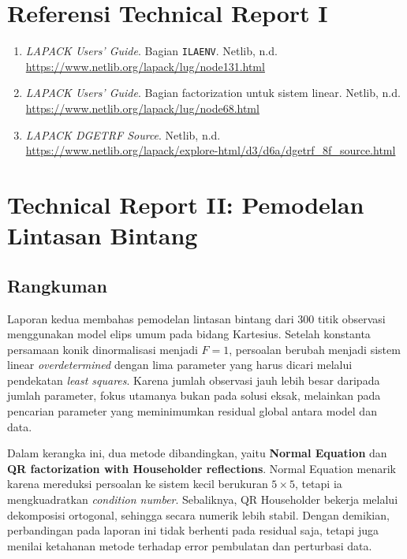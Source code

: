 \documentclass[12pt,a4paper]{article}
\begin{document}
\section*{Referensi Technical Report I}
\begin{enumerate}[leftmargin=1.25em]
  \item \emph{LAPACK Users' Guide}. Bagian \texttt{ILAENV}. Netlib, n.d. \url{https://www.netlib.org/lapack/lug/node131.html}
  \item \emph{LAPACK Users' Guide}. Bagian factorization untuk sistem linear. Netlib, n.d. \url{https://www.netlib.org/lapack/lug/node68.html}
  \item \emph{LAPACK DGETRF Source}. Netlib, n.d. \url{https://www.netlib.org/lapack/explore-html/d3/d6a/dgetrf_8f_source.html}
\end{enumerate}

\clearpage
\section*{Technical Report II: Pemodelan Lintasan Bintang}

\subsection*{Rangkuman}
Laporan kedua membahas pemodelan lintasan bintang dari 300 titik observasi menggunakan model elips umum pada bidang Kartesius. Setelah konstanta persamaan konik dinormalisasi menjadi $F=1$, persoalan berubah menjadi sistem linear \emph{overdetermined} dengan lima parameter yang harus dicari melalui pendekatan \emph{least squares}. Karena jumlah observasi jauh lebih besar daripada jumlah parameter, fokus utamanya bukan pada solusi eksak, melainkan pada pencarian parameter yang meminimumkan residual global antara model dan data.

Dalam kerangka ini, dua metode dibandingkan, yaitu \textbf{Normal Equation} dan \textbf{QR factorization with Householder reflections}. Normal Equation menarik karena mereduksi persoalan ke sistem kecil berukuran $5\times 5$, tetapi ia mengkuadratkan \emph{condition number}. Sebaliknya, QR Householder bekerja melalui dekomposisi ortogonal, sehingga secara numerik lebih stabil. Dengan demikian, perbandingan pada laporan ini tidak berhenti pada residual saja, tetapi juga menilai ketahanan metode terhadap error pembulatan dan perturbasi data.
\end{document}
